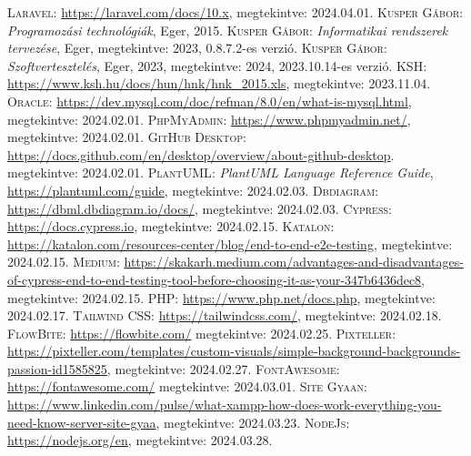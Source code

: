 \documentclass[]{thesis-ekf}
\theoremstyle{definition}
\theoremstyle{remark}
\begin{document}
	
	\begin{thebibliography}{2}
		\textsc{Laravel:} \url{https://laravel.com/docs/10.x},  megtekintve: 2024.04.01.
		\textsc{Kusper Gábor}: \emph{Programozási technológiák}, Eger, 2015.
		\textsc{Kusper Gábor}: \emph{Informatikai rendszerek tervezése}, Eger, megtekintve: 2023, 0.8.7.2-es verzió.
		\textsc{Kusper Gábor}: \emph{Szoftvertesztelés}, Eger, 2023, megtekintve: 2024, 2023.10.14-es verzió.
		\textsc{KSH}: \url{https://www.ksh.hu/docs/hun/hnk/hnk_2015.xls}, megtekintve: 2023.11.04.
		\textsc{Oracle}: \url{https://dev.mysql.com/doc/refman/8.0/en/what-is-mysql.html}, megtekintve: 2024.02.01.
		\textsc{PhpMyAdmin}: \url{https://www.phpmyadmin.net/}, megtekintve: 2024.02.01.
		\textsc{GitHub Desktop}: \url{https://docs.github.com/en/desktop/overview/about-github-desktop}. megtekintve: 2024.02.01.
		\textsc{PlantUML}: \emph{PlantUML Language Reference Guide}, \url{https://plantuml.com/guide}, megtekintve: 2024.02.03.
		\textsc{Dbdiagram}: \url{https://dbml.dbdiagram.io/docs/},  megtekintve: 2024.02.03.
		\textsc{Cypress}: \url{https://docs.cypress.io},  megtekintve: 2024.02.15.
		\textsc{Katalon}: \url{https://katalon.com/resources-center/blog/end-to-end-e2e-testing},  megtekintve: 2024.02.15.
		\textsc{Medium}: \url{https://skakarh.medium.com/advantages-and-disadvantages-of-cypress-end-to-end-testing-tool-before-choosing-it-as-your-347b6436dec8}, megtekintve: 2024.02.15.
		\textsc{PHP}: \url{https://www.php.net/docs.php},  megtekintve: 2024.02.17.
		\textsc{Tailwind CSS}: \url{https://tailwindcss.com/}, megtekintve: 2024.02.18.
		\textsc{FlowBite}: \url{https://flowbite.com/} megtekintve: 2024.02.25.
		\textsc{Pixteller}: \url{https://pixteller.com/templates/custom-visuals/simple-background-backgrounds-passion-id1585825}, megtekintve: 2024.02.27.
		\textsc{FontAwesome}: \url{https://fontawesome.com/} megtekintve: 2024.03.01.
		\textsc{Site Gyaan}: \url{https://www.linkedin.com/pulse/what-xampp-how-does-work-everything-you-need-know-server-site-gyaa}, megtekintve: 2024.03.23.
		\textsc{NodeJs}: \url{https://nodejs.org/en}, megtekintve: 2024.03.28.

\end{thebibliography}
\end{document}
